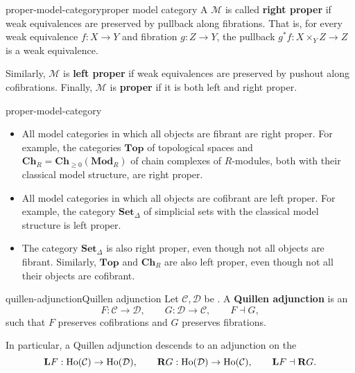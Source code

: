 \begin{topic}{proper-model-category}{proper model category}
    A  $\mathcal{M}$ is called \textbf{right proper} if weak equivalences are preserved by pullback along fibrations. That is, for every weak equivalence $f : X \to Y$ and fibration $g : Z \to Y$, the pullback $g^* f : X \times_Y Z \to Z$ is a weak equivalence.
    
    Similarly, $\mathcal{M}$ is \textbf{left proper} if weak equivalences are preserved by pushout along cofibrations.
    Finally, $\mathcal{M}$ is \textbf{proper} if it is both left and right proper.
\end{topic}

\begin{example}{proper-model-category}
    \begin{itemize}
        \item All model categories in which all objects are fibrant are right proper. For example, the categories $\textbf{Top}$ of topological spaces and $\textbf{Ch}_R = \textbf{Ch}_{\ge 0}(\textbf{Mod}_R)$ of chain complexes of $R$-modules, both with their classical model structure, are right proper.
        \item All model categories in which all objects are cofibrant are left proper. For example, the category $\textbf{Set}_\Delta$ of simplicial sets with the classical model structure is left proper. 
        \item The category $\textbf{Set}_\Delta$ is also right proper, even though not all objects are fibrant. Similarly, $\textbf{Top}$ and $\textbf{Ch}_R$ are also left proper, even though not all their objects are cofibrant.
    \end{itemize}
\end{example}

\begin{topic}{quillen-adjunction}{Quillen adjunction}
    Let $\mathcal{C}, \mathcal{D}$ be . A \textbf{Quillen adjunction} is an 
    \[ F : \mathcal{C} \to \mathcal{D}, \qquad G : \mathcal{D} \to \mathcal{C}, \qquad F \dashv G , \]
    such that $F$ preserves cofibrations and $G$ preserves fibrations.
    
    In particular, a Quillen adjunction descends to an adjunction on the 
    \[ \textbf{L} F : \textup{Ho}(\mathcal{C}) \to \textup{Ho}(\mathcal{D}), \qquad \textbf{R} G : \textup{Ho}(\mathcal{D}) \to \textup{Ho}(\mathcal{C}), \qquad \textbf{L} F \dashv \textbf{R} G . \]
\end{topic}


